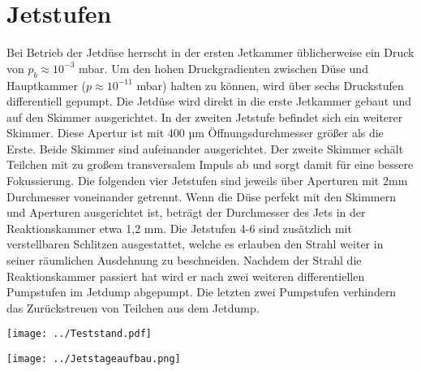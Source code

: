 
\section{Jetstufen} \label{sec:Jetstufen}

Bei Betrieb der Jetdüse herrscht in der ersten Jetkammer üblicherweise ein Druck von $p_b \approx 10^{-3}$ mbar. Um den hohen Druckgradienten zwischen Düse und Hauptkammer ($p \approx 10^{-11}$ mbar) halten zu können, wird über sechs Druckstufen differentiell gepumpt. 
Die Jetdüse wird direkt in die erste Jetkammer gebaut und auf den Skimmer ausgerichtet. In der zweiten Jetstufe befindet sich ein weiterer Skimmer. Diese Apertur ist mit 400 µm Öffnungsdurchmesser größer als die Erste. Beide Skimmer sind aufeinander ausgerichtet. Der zweite Skimmer schält Teilchen mit zu großem transversalem Impuls ab und sorgt damit für eine bessere Fokussierung. Die folgenden vier Jetstufen sind jeweils über Aperturen mit 2mm Durchmesser voneinander getrennt. Wenn die Düse perfekt mit den Skimmern und Aperturen ausgerichtet ist, beträgt der Durchmesser des Jets in der Reaktionskammer etwa 1,2 mm. Die Jetstufen 4-6 sind zusätzlich mit verstellbaren Schlitzen ausgestattet, welche es erlauben den Strahl weiter in seiner räumlichen Ausdehnung zu beschneiden. Nachdem der Strahl die Reaktionskammer passiert hat wird er nach zwei weiteren differentiellen Pumpstufen im Jetdump abgepumpt. Die letzten zwei Pumpstufen verhindern das Zurückstreuen von Teilchen aus dem Jetdump.

\begin{center}
\begin{minipage}{\linewidth}
\centering
\texttt{[image: ../Teststand.pdf]}%
 \label{fig:Teststand}
\end{minipage} 
\end{center} 

\begin{center}
\begin{minipage}{\linewidth}
\centering
\texttt{[image: ../Jetstageaufbau.png]}%
 \label{fig:Jetstageaufbau}
\end{minipage} 
\end{center} 